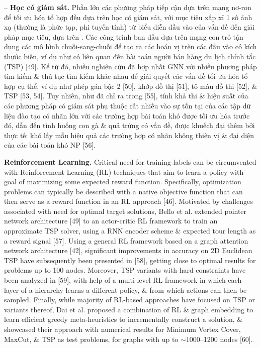 \documentclass{article}
\begin{document}
\begin{itemize}
    -- {\bf Học có giám sát.} Phần lớn các phương pháp tiếp cận dựa trên mạng nơ-ron để tối ưu hóa tổ hợp đều dựa trên học có giám sát, với mục tiêu xấp xỉ 1 số ánh xạ (thường là phức tạp, phi tuyến tính) từ biểu diễn đầu vào của vấn đề đến giải pháp mục tiêu, dựa trên . Các công trình ban đầu dựa trên mạng con trỏ tận dụng các mô hình chuỗi-sang-chuỗi để tạo ra các hoán vị trên các đầu vào có kích thước biến, ví dụ như có liên quan đến bài toán người bán hàng du lịch chính tắc (TSP) [49]. Kể từ đó, nhiều nghiên cứu đã hợp nhất GNN với nhiều phương pháp tìm kiếm \& thủ tục tìm kiếm khác nhau để giải quyết các vấn đề tối ưu hóa tổ hợp cụ thể, ví dụ như phép gán bậc 2 [50], khớp đồ thị [51], tô màu đồ thị [52], \& TSP [53, 54]. Tuy nhiên, như đã chỉ ra trong [55], tính khả thi \& hiệu suất của các phương pháp có giám sát phụ thuộc rất nhiều vào sự tồn tại của các tập dữ liệu đào tạo có nhãn lớn với các trường hợp bài toán khó được tối ưu hóa trước đó, dẫn đến tình huống con gà \& quả trứng có vấn đề, được khuếch đại thêm bởi thực tế: khó lấy mẫu hiệu quả các trường hợp có nhãn không thiên vị \& đại diện của các bài toán khó NP [56].

    {\bf Reinforcement Learning.} Critical need for training labels can be circumvented with Reinforcement Learning (RL) techniques that aim to learn a policy with goal of maximizing some expected reward function. Specifically, optimization problems can typically be described with a native objective function that can then serve as a reward function in an RL approach [46]. Motivated by challenges associated with need for optimal target solutions, Bello et al. extended pointer network architecture [49] to an actor-critic RL framework to train an approximate TSP solver, using a RNN encoder scheme \& expected tour length as a reward signal [57]. Using a general RL framework based on a graph attention network architecture [42], significant improvements in accuracy on 2D Euclidean TSP have subsequently been presented in [58], getting close to optimal results for problems up to 100 nodes. Moreover, TSP variants with hard constraints have been analyzed in [59], with help of a multi-level RL framework in which each layer of a hierarchy learns a different policy, \& from which actions can then be sampled. Finally, while majority of RL-based approaches have focused on TSP or variants thereof, Dai et al. proposed a combination of RL \& graph embedding to learn efficient greedy meta-heuristics to incrementally construct a solution, \& showcased their approach with numerical results for Minimum Vertex Cover, MaxCut, \& TSP as test problems, for graphs with up to $\sim1000$--1200 nodes [60].


\end{itemize}
\end{document}
